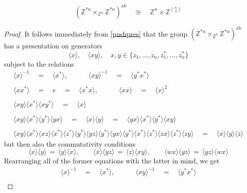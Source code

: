 \documentclass{amsbook} %
\numberwithin{section}{chapter}
\begin{document}
\begin{prop} \label{abst}
\[ (\mathbb{Z}^{\ast n} \times_{\mathbb{Z}^n} \mathbb{Z}^{\ast n})^{\mathrm{ab}} \quad \cong \quad \mathbb{Z}^n \times {\mathbb{Z}}^{{n}\choose{2}} \]
\end{prop}
\begin{proof}
It follows immediately from \cref{pushpres} that the group $(\mathbb{Z}^{\ast n} \times_{\mathbb{Z}^n} \mathbb{Z}^{\ast n})^{\mathrm{ab}}$ has a presentation on generators
\[ \langle x \rangle, \quad \langle xy \rangle, \quad x,y \in \{z_1, ..., z_n, z_1^*, ..., z_n^*\} \]
subject to the relations
\[ \begin{array}{c}
			\langle x \rangle^{-1} \quad = \quad \langle x^* \rangle, \quad \quad \quad \langle xy \rangle^{-1} \quad = \quad \langle y^*x^* \rangle \\
			\\
			\langle xx^* \rangle \quad = \quad e \quad = \quad \langle x^*x \rangle, \quad \quad \quad \langle xx \rangle \quad = \quad \langle x \rangle^2 \\
			\\
			\langle xy \rangle \langle x^* \rangle \langle xy^* \rangle \quad = \quad \langle x \rangle  \\
			\\
			\langle xy \rangle \langle x^* \rangle \langle y^* \rangle \langle yx \rangle \quad = \quad \langle x \rangle \langle y \rangle  \quad = \quad \langle yx \rangle \langle x^* \rangle \langle y^* \rangle \langle xy \rangle \\
			\\
			\langle xy \rangle \langle x^* \rangle \langle xz \rangle \langle x^* \rangle \langle z^* \rangle \langle y^* \rangle \langle yz \rangle \langle y^* \rangle \langle yx \rangle \langle y^* \rangle \langle x^* \rangle \langle z^* \rangle \langle zx \rangle \langle z^* \rangle \langle zy \rangle \quad = \quad \langle x \rangle\langle y \rangle\langle z \rangle 
		\end{array}
\]
but then also the commutativity conditions
\[ \langle x \rangle \langle y \rangle \, = \, \langle y \rangle \langle x \rangle, \quad \quad \langle x \rangle \langle yz \rangle \, = \, \langle z \rangle \langle xy \rangle, \quad \quad	\langle wx \rangle \langle yz \rangle \, = \, \langle yz \rangle \langle wx \rangle \] 
Rearranging all of the former equations with the latter in mind, we get
\[ \begin{array}{c}
			\langle x \rangle^{-1} \quad = \quad \langle x^* \rangle, \quad \quad \quad \langle xy \rangle^{-1} \quad = \quad \langle y^*x^* \rangle \\

\end{array}\]
\end{proof}
\end{document}
